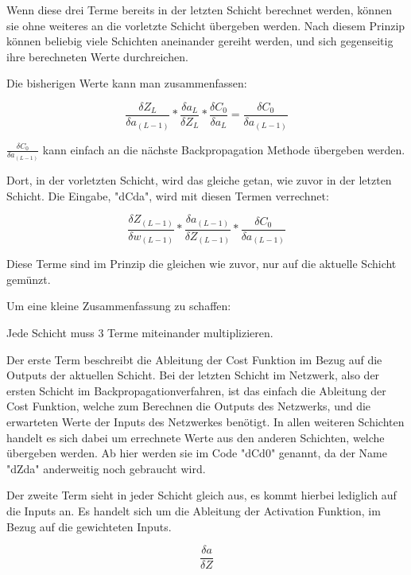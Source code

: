 \documentclass[12pt]{article}
\begin{document}
Wenn diese drei Terme bereits in der letzten Schicht berechnet werden, können sie ohne weiteres an die vorletzte Schicht übergeben werden. Nach diesem Prinzip können beliebig viele Schichten aneinander gereiht werden, und sich gegenseitig ihre berechneten Werte durchreichen. 

Die bisherigen Werte kann man zusammenfassen:

$$
\frac{\delta Z_L}{\delta a_{(L-1)}}*
\frac{\delta a_L}{\delta Z_L}*
\frac{\delta C_0}{\delta a_L}
= \frac{\delta C_0}{\delta a_{(L-1)}}
$$

$\frac{\delta C_0}{\delta a_{(L-1)}}$ kann einfach an die nächste Backpropagation Methode übergeben werden.

Dort, in der vorletzten Schicht, wird das gleiche getan, wie zuvor in der letzten Schicht. Die Eingabe, "dCda", wird mit diesen Termen verrechnet:

$$
\frac{\delta Z_{(L-1)}}{\delta w_{(L-1)}}*
\frac{\delta a_{(L-1)}}{\delta Z_{(L-1)}}*
\frac{\delta C_0}{\delta a_{(L-1)}}
$$

Diese Terme sind im Prinzip die gleichen wie zuvor, nur auf die aktuelle Schicht gemünzt. 

Um eine kleine Zusammenfassung zu schaffen:

Jede Schicht muss 3 Terme miteinander multiplizieren. 

Der erste Term beschreibt die Ableitung der Cost Funktion im Bezug auf die Outputs der aktuellen Schicht. Bei der letzten Schicht im Netzwerk, also der ersten Schicht im Backpropagationverfahren, ist das einfach die Ableitung der Cost Funktion, welche zum Berechnen die Outputs des Netzwerks, und die erwarteten Werte der Inputs des Netzwerkes benötigt. In allen weiteren Schichten handelt es sich dabei um errechnete Werte aus den anderen Schichten, welche übergeben werden. Ab hier werden sie im Code "dCd0" genannt, da der Name "dZda" anderweitig noch gebraucht wird.

Der zweite Term sieht in jeder Schicht gleich aus, es kommt hierbei lediglich auf die Inputs an. Es handelt sich um die Ableitung der Activation Funktion, im Bezug auf die gewichteten Inputs.

$$\frac{\delta a}{\delta Z}$$
\end{document}
